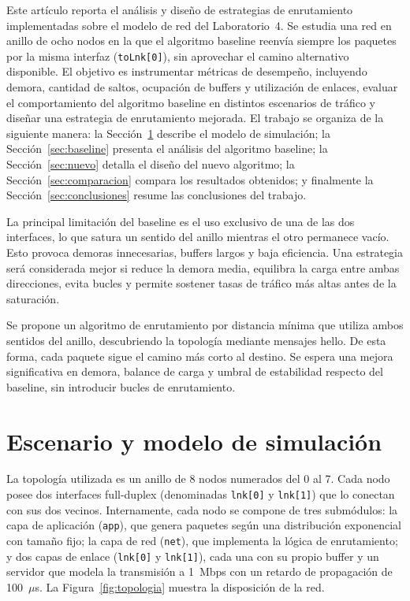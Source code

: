 \documentclass[10pt,letterpaper,twocolumn]{article}
\begin{document}
Este artículo reporta el análisis y diseño de estrategias de enrutamiento
implementadas sobre el modelo de red del Laboratorio~4. Se estudia una red
en anillo de ocho nodos en la que el algoritmo baseline reenvía siempre los
paquetes por la misma interfaz (\texttt{toLnk[0]}), sin aprovechar el camino
alternativo disponible. El objetivo es instrumentar métricas de desempeño,
incluyendo demora, cantidad de saltos, ocupación de buffers y utilización de
enlaces, evaluar el comportamiento del algoritmo baseline en distintos
escenarios de tráfico y diseñar una estrategia de enrutamiento mejorada. El
trabajo se organiza de la siguiente manera: la Sección~\ref{sec:modelo}
describe el modelo de simulación; la Sección~\ref{sec:baseline} presenta el
análisis del algoritmo baseline; la Sección~\ref{sec:nuevo} detalla el diseño
del nuevo algoritmo; la Sección~\ref{sec:comparacion} compara los resultados
obtenidos; y finalmente la Sección~\ref{sec:conclusiones} resume las
conclusiones del trabajo.

La principal limitación del baseline es el uso exclusivo de una de las dos
interfaces, lo que satura un sentido del anillo mientras el otro permanece
vacío. Esto provoca demoras innecesarias, buffers largos y baja eficiencia.
Una estrategia será considerada mejor si reduce la demora media, equilibra la
carga entre ambas direcciones, evita bucles y permite sostener tasas de
tráfico más altas antes de la saturación.

Se propone un algoritmo de enrutamiento por distancia mínima que utiliza ambos
sentidos del anillo, descubriendo la topología mediante mensajes hello. De
esta forma, cada paquete sigue el camino más corto al destino. Se espera una
mejora significativa en demora, balance de carga y umbral de estabilidad
respecto del baseline, sin introducir bucles de enrutamiento.

\section{Escenario y modelo de simulación}
\label{sec:modelo}

La topología utilizada es un anillo de 8 nodos numerados del 0 al 7. Cada nodo posee dos interfaces full-duplex (denominadas \texttt{lnk[0]} y \texttt{lnk[1]}) que lo conectan con sus dos vecinos. Internamente, cada nodo se compone de tres submódulos: la capa de aplicación (\texttt{app}), que genera paquetes según una distribución exponencial con tamaño fijo; la capa de red (\texttt{net}), que implementa la lógica de enrutamiento; y dos capas de enlace (\texttt{lnk[0]} y \texttt{lnk[1]}), cada una con su propio buffer y un servidor que modela la transmisión a 1~Mbps con un retardo de propagación de 100~$\mu$s. La Figura~\ref{fig:topologia} muestra la disposición de la red.
\end{document}
